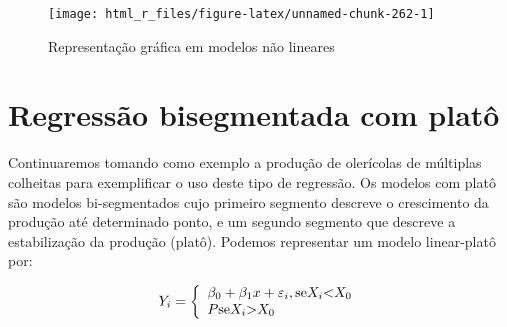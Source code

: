 \documentclass[
]{book}
\numberwithin{equation}{section}
\begin{document}
\begin{figure}

{\centering \texttt{[image: html\_r\_files/figure-latex/unnamed-chunk-262-1]} 

}

\caption{Representação gráfica em modelos não lineares}\label{fig:unnamed-chunk-262}
\end{figure}

\hypertarget{regressuxe3o-bisegmentada-com-platuxf4}{%
\section{Regressão bisegmentada com platô}\label{regressuxe3o-bisegmentada-com-platuxf4}}

Continuaremos tomando como exemplo a produção de olerícolas de múltiplas colheitas para exemplificar o uso deste tipo de regressão. Os modelos com platô são modelos bi-segmentados cujo primeiro segmento descreve o crescimento da produção até determinado ponto, e um segundo segmento que descreve a estabilização da produção (platô). Podemos representar um modelo linear-platô por:

\[
{Y_i} = \left\{ \begin{array}{l}{\beta _0} + {\beta _1}x + {\varepsilon _i}{\rm{, se }}{X_i}{\rm{  <  }}{X_0}\\P{\rm{ se }}{X_i}{\rm{  >  }}{X_0}{\rm{ }}\end{array} \right.
\]
\end{document}
